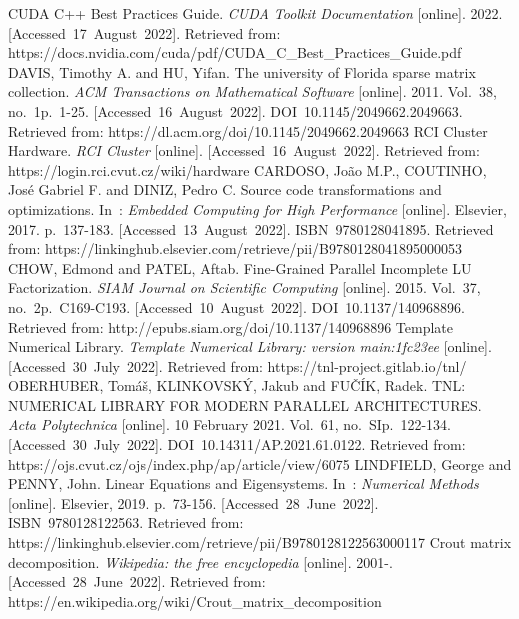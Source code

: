 \clearpage  							   	 %

\begin{thebibliography}{45}
	
	CUDA C++ Best Practices Guide. \textit{CUDA Toolkit Documentation} [online]. 2022. [Accessed 17 August 2022]. Retrieved from: https://docs.nvidia.com/cuda/pdf/CUDA\_C\_Best\_Practices\_Guide.pdf
	DAVIS, Timothy A. and HU, Yifan. The university of Florida sparse matrix collection. \textit{ACM Transactions on Mathematical Software} [online]. 2011. Vol. 38, no. 1p. 1-25. [Accessed 16 August 2022]. DOI 10.1145/2049662.2049663. Retrieved from: https://dl.acm.org/doi/10.1145/2049662.2049663
	RCI Cluster Hardware. \textit{RCI Cluster} [online]. [Accessed 16 August 2022]. Retrieved from: https://login.rci.cvut.cz/wiki/hardware
	CARDOSO, João M.P., COUTINHO, José Gabriel F. and DINIZ, Pedro C. Source code transformations and optimizations. In : \textit{Embedded Computing for High Performance} [online]. Elsevier, 2017. p. 137-183. [Accessed 13 August 2022]. ISBN 9780128041895. Retrieved from: https://linkinghub.elsevier.com/retrieve/pii/B9780128041895000053
	CHOW, Edmond and PATEL, Aftab. Fine-Grained Parallel Incomplete LU Factorization. \textit{SIAM Journal on Scientific Computing} [online]. 2015. Vol. 37, no. 2p. C169-C193. [Accessed 10 August 2022]. DOI 10.1137/140968896. Retrieved from: http://epubs.siam.org/doi/10.1137/140968896
	Template Numerical Library. \textit{Template Numerical Library: version main:1fc23ee} [online]. [Accessed 30 July 2022]. Retrieved from: https://tnl-project.gitlab.io/tnl/
	OBERHUBER, Tomáš, KLINKOVSKÝ, Jakub and FUČÍK, Radek. TNL: NUMERICAL LIBRARY FOR MODERN PARALLEL ARCHITECTURES. \textit{Acta Polytechnica} [online]. 10 February 2021. Vol. 61, no. SIp. 122-134. [Accessed 30 July 2022]. DOI 10.14311/AP.2021.61.0122. Retrieved from: https://ojs.cvut.cz/ojs/index.php/ap/article/view/6075
	LINDFIELD, George and PENNY, John. Linear Equations and Eigensystems. In : \textit{Numerical Methods} [online]. Elsevier, 2019. p. 73-156. [Accessed 28 June 2022]. ISBN 9780128122563. Retrieved from: https://linkinghub.elsevier.com/retrieve/pii/B9780128122563000117
	Crout matrix decomposition. \textit{Wikipedia: the free encyclopedia} [online]. 2001-. [Accessed 28 June 2022]. Retrieved from: https://en.wikipedia.org/wiki/Crout\_matrix\_decomposition

\end{thebibliography}
